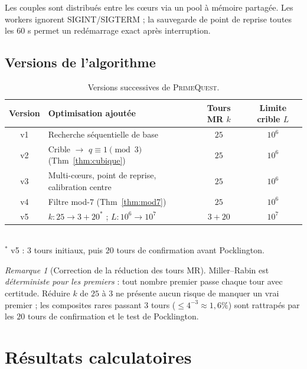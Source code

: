 \documentclass[11pt,a4paper]{article}
\theoremstyle{definition}
\theoremstyle{remark}
\newtheorem{remarque}[theoreme]{Remarque}
\begin{document}
Les couples sont distribués entre les cœurs via un pool à mémoire partagée.
Les workers ignorent SIGINT/SIGTERM ; la sauvegarde de point de reprise
toutes les $60$ s permet un redémarrage exact après interruption.

\subsection{Versions de l'algorithme}

\begin{table}[ht]\centering
\caption{Versions successives de \textsc{PrimeQuest}.}
\label{tab:versions}
\begin{tabular}{@{}clcc@{}}
\toprule
Version & Optimisation ajoutée & Tours MR $k$ & Limite crible $L$ \\
\midrule
v1 & Recherche séquentielle de base & $25$ & $10^6$ \\
v2 & Crible $\to$ $q\equiv 1\pmod{3}$ (Thm~\ref{thm:cubique}) & $25$ & $10^6$ \\
v3 & Multi-cœurs, point de reprise, calibration centre & $25$ & $10^6$ \\
v4 & Filtre mod-$7$ (Thm~\ref{thm:mod7}) & $25$ & $10^6$ \\
v5 & $k\colon 25\to 3+20^{*}$ ; $L\colon 10^6\to 10^7$ & $3+20$ & $10^7$ \\
\bottomrule
\end{tabular}\\[3pt]
\footnotesize $^{*}$ v5 : $3$ tours initiaux, puis $20$ tours de
confirmation avant Pocklington.
\end{table}

\begin{remarque}[Correction de la réduction des tours MR]
Miller--Rabin est \emph{déterministe pour les premiers} : tout nombre
premier passe chaque tour avec certitude. Réduire $k$ de $25$ à $3$ ne
présente aucun risque de manquer un vrai premier ; les composites rares
passant $3$ tours ($\leq 4^{-3}\approx 1{,}6\%$) sont rattrapés par
les $20$ tours de confirmation et le test de Pocklington.
\end{remarque}

\section{Résultats calculatoires}\label{sec:resultats}
\end{document}
